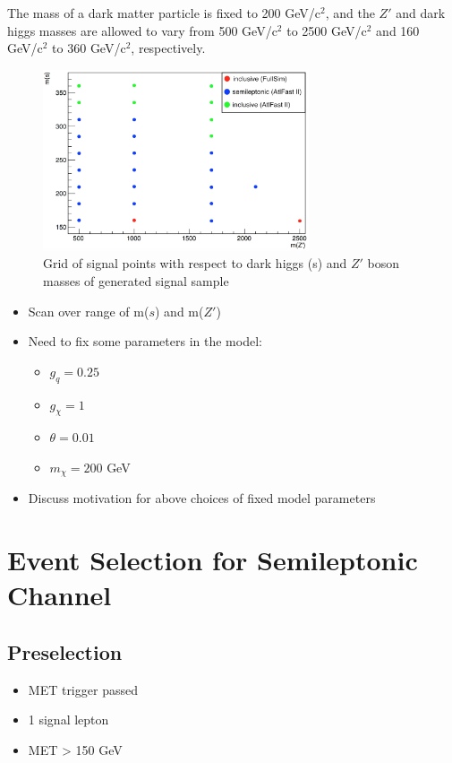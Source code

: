 \documentclass[12pt]{article}
\begin{document}
The mass of a dark matter particle is fixed to 200 GeV/c$^2$, and the $Z'$ and dark higgs masses are allowed to vary from 500 GeV/c$^2$ to 2500 GeV/c$^2$ and 160 GeV/c$^2$ to 360 GeV/c$^2$, respectively. 

\begin{figure}[H]
	\centering
	\includegraphics[width=0.7\textwidth]{figures/SignalGrid.png}
	\caption[]{Grid of signal points with respect to dark higgs (s) and $Z'$ boson masses of generated signal sample}
	\label{fig:signalgrid}
\end{figure}

\begin{itemize}
	\item Scan over range of m($s$) and m($Z'$)
	\item Need to fix some parameters in the model:
	\begin{itemize}
		\item $g_{q} = 0.25$
		\item $g_{\chi} = 1$
		\item $\theta = 0.01$
		\item $m_{\chi} = 200$ GeV
	\end{itemize}
	\item Discuss motivation for above choices of fixed model parameters
\end{itemize}

\section{Event Selection for Semileptonic Channel}

\subsection{Preselection}
\begin{itemize}
\item MET trigger passed
\item 1 signal lepton
\item MET > 150 GeV
\end{itemize}
\end{document}
